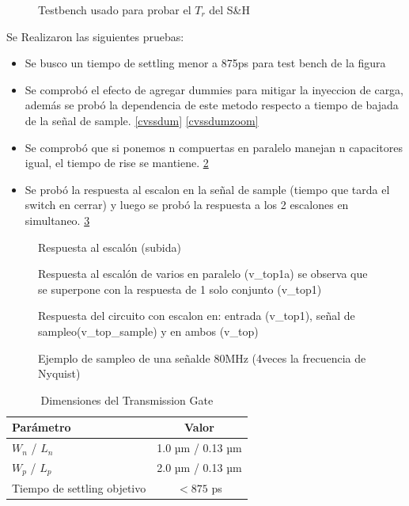\documentclass[12pt,a4paper]{report}
\begin{document}
\begin{figure}[H]
    \centering
    
    \caption{Testbench usado para probar el $T_r$ del S\&H}
\end{figure}


Se Realizaron las siguientes pruebas:
\begin{itemize}
    \item Se busco un tiempo de settling menor a 875ps para test bench de la figura
    \item Se comprobó el efecto de agregar dummies para mitigar la inyeccion de carga, además se probó la dependencia de este metodo respecto a tiempo de bajada de la señal de sample. \cref{cvssdum} \cref{cvssdumzoom}
    \item Se comprobó que si ponemos n compuertas en paralelo manejan n capacitores igual, el tiempo de rise se mantiene. \cref{risetopa}
    \item Se probó la respuesta al escalon en la señal de sample (tiempo que tarda el switch en cerrar) y luego se probó la respuesta a los 2 escalones en simultaneo. \cref{escalones}
\end{itemize}
\begin{figure}[H]
    \centering
    
    \caption{Respuesta al escalón (subida)}
        \label{risetop}
\end{figure}

\begin{figure}[H]
    \centering
    
    \caption{Respuesta al escalón de varios en paralelo (v\_top1a) se observa que se superpone con la respuesta de 1 solo conjunto (v\_top1)}
        \label{risetopa}
\end{figure}


\begin{figure}[H]
    \centering
    
    \caption{Respuesta del circuito con escalon en: entrada (v\_top1), señal de sampleo(v\_top\_sample) y en ambos (v\_top)}
        \label{escalones}
\end{figure}

\begin{figure}[H]
    \centering
    
    \caption{Ejemplo de sampleo de una señalde 80MHz (4veces la frecuencia de Nyquist)}
    \label{respuestaac}
\end{figure}

\begin{table}[h]
\centering
\caption{Dimensiones del Transmission Gate}
    \label{tgmedidas}
\begin{tabular}{|l|c|}
\hline
\textbf{Parámetro} & \textbf{Valor} \\
\hline
$W_n$ / $L_n$ & 1.0 µm / 0.13 µm \\
$W_p$ / $L_p$ & 2.0 µm / 0.13 µm \\
Tiempo de settling objetivo & $<875$ ps \\
\hline
\end{tabular}
\end{table}
\end{document}
